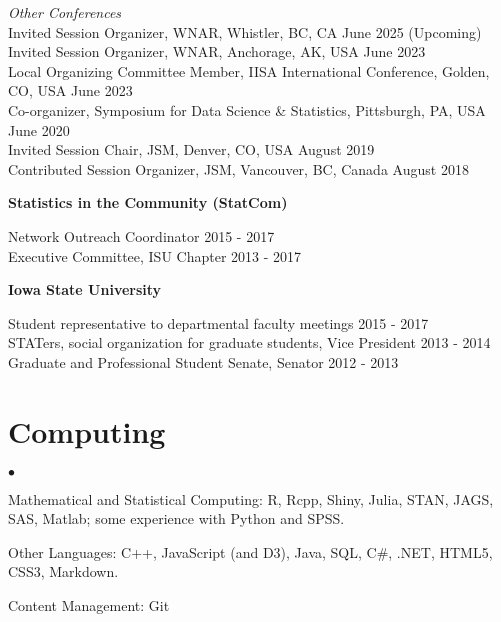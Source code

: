 \documentclass[margin,line]{res}
\newenvironment{list2}{
  \begin{list}{$\bullet$}{%
      \setlength{\itemsep}{0in}
      \setlength{\parsep}{0in} \setlength{\parskip}{0in}
      \setlength{\topsep}{0in} \setlength{\partopsep}{0in}
      \setlength{\leftmargin}{0.2in}}}{\end{list}}
\begin{document}
\begin{resume}
\vspace{-.3cm}
{\em Other Conferences} \\
Invited Session Organizer, WNAR, Whistler, BC, CA \hfill {June 2025 (Upcoming)} \\
Invited Session Organizer, WNAR, Anchorage, AK, USA \hfill {June 2023} \\
Local Organizing Committee Member,  IISA International Conference, Golden, CO, USA \hfill {June 2023} \\
Co-organizer, Symposium for Data Science \& Statistics, Pittsburgh, PA, USA \hfill {June 2020} \\
Invited Session Chair, JSM, Denver, CO, USA \hfill {August 2019} \\
Contributed Session Organizer, JSM, Vancouver, BC, Canada \hfill {August 2018}

{\bf Statistics in the Community (StatCom)}

\vspace{-.3cm}
Network Outreach Coordinator \hfill {2015 - 2017}\\
Executive Committee, ISU Chapter \hfill {2013 - 2017}

{\bf Iowa State University}

\vspace{-.3cm}
Student representative to departmental faculty meetings \hfill {2015 - 2017}\\
STATers, social organization for graduate students, Vice President \hfill {2013 - 2014}\\
Graduate and Professional Student Senate, Senator \hfill {2012 - 2013}



\section{\sc Computing}
\begin{list2}
\item Mathematical and Statistical Computing:  R, Rcpp, Shiny, Julia, STAN, JAGS, SAS, Matlab; some experience  with Python and SPSS.
\item Other Languages: C++, JavaScript (and D3), Java, SQL, C\#, .NET, HTML5, CSS3, Markdown.
\item Content Management: Git
\end{list2}


\end{resume}
\end{document}
